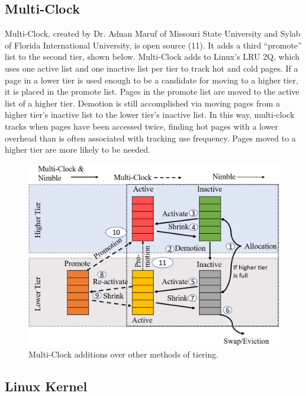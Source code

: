 \documentclass[conference]{IEEEtran}
\begin{document}
\subsection{Multi-Clock}

Multi-Clock, created by Dr. Adnan Maruf of Missouri State University and Sylab of Florida International University, is open source (11).  It adds a third “promote” list to the second tier, shown below.  Multi-Clock adds to Linux’s LRU 2Q, which uses one active list and one inactive list per tier to track hot and cold pages.  If a page in a lower tier is used enough to be a candidate for moving to a higher tier, it is placed in the promote list.  Pages in the promote list are moved to the active list of a higher tier. Demotion is still accomplished via moving pages from a higher tier’s inactive list to the lower tier’s inactive list.  In this way, multi-clock tracks when pages have been accessed twice, finding hot pages with a lower overhead than is often associated with tracking use frequency.  Pages moved to a higher tier are more likely to be needed. 

\begin{figure}
    \centering
    \includegraphics[scale=0.21]{multiclock addition.png}
    \caption{Multi-Clock additions over other methods of tiering.}
\end{figure}

\subsection{Linux Kernel}
\end{document}
